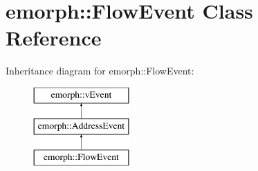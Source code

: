 \hypertarget{classemorph_1_1FlowEvent}{\section{emorph\-:\-:Flow\-Event Class Reference}
\label{classemorph_1_1FlowEvent}
}
Inheritance diagram for emorph\-:\-:Flow\-Event\-:\begin{figure}[H]
\begin{center}
\leavevmode
\includegraphics[height=3.000000cm]{classemorph_1_1FlowEvent}
\end{center}
\end{figure}

